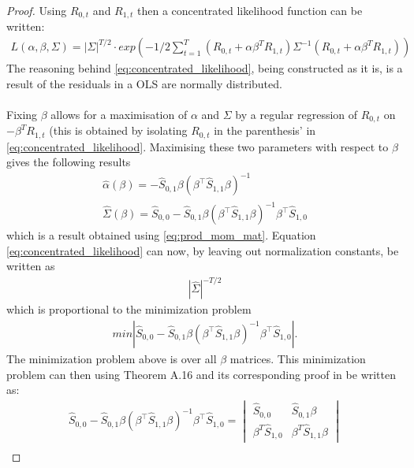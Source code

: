 \begin{proof}
    Using $R_{0,t}$ and $R_{1,t}$ then a concentrated likelihood function can be written:
    \begin{align}\label{eq:concentrated_likelihood}
        L(\alpha,\beta,\Sigma)=|\Sigma|^{T/2}\cdot exp\left(-1/2\sum_{t=1}^T\left(R_{0,t}+\alpha\beta^T R_{1,t}\right)\Sigma^{-1}\left(R_{0,t}+\alpha\beta^T R_{1,t}\right)\right)
    \end{align}
    The reasoning behind \eqref{eq:concentrated_likelihood}, being constructed as it is, is a result of the residuals in a OLS are normally distributed.\\\\
 Fixing $\beta$ allows for a maximisation of $\alpha$ and $\Sigma$ by a regular regression of $R_{0,t}$ on $-\beta^TR_{1,t}$ (this is obtained by isolating $R_{0,t}$ in the parenthesis' in \eqref{eq:concentrated_likelihood}. Maximising these two parameters with respect to $\beta$ gives the following results
 \begin{align}\label{eq:max_alphaandsigma}
     \hat{\alpha}(\beta)=-\hat{S}_{0,1}\beta(\beta^\top \hat{S}_{1,1}\beta)^{-1}\\
     \hat{\Sigma}(\beta)=\hat{S}_{0,0}-\hat{S}_{0,1}\beta\left(\beta^\top \hat{S}_{1,1}\beta\right)^{-1}\beta^\top \hat{S}_{1,0}
 \end{align}
 which is a result obtained using \eqref{eq:prod_mom_mat}. Equation \eqref{eq:concentrated_likelihood} can now, by leaving out normalization constants, be written as
 \begin{align*}
     |\hat{\Sigma}|^{-T/2}
 \end{align*}
 which is proportional to the minimization problem
 \begin{align}
     min|\hat{S}_{0,0}-\hat{S}_{0,1}\beta\left(\beta^\top \hat{S}_{1,1}\beta\right)^{-1}\beta^\top \hat{S}_{1,0}|.%
 \end{align}
 The minimization problem above is over all $\beta$ matrices. This minimization problem can then using Theorem A.16 and its corresponding proof in \cite{Linear_Models:_Least_Squares_and_Alternatives_Second_Edition} be written as:
 \begin{align*}
     \hat{S}_{0,0}-\hat{S}_{0,1}\beta\left(\beta^\top \hat{S}_{1,1}\beta\right)^{-1}\beta^\top \hat{S}_{1,0}=\begin{vmatrix}
         \hat{S}_{0,0}&\hat{S}_{0,1}\beta\\
         \beta^T\hat{S}_{1,0}&\beta^T \hat{S}_{1,1}\beta\end{vmatrix}\\

\end{align*}
\end{proof}
